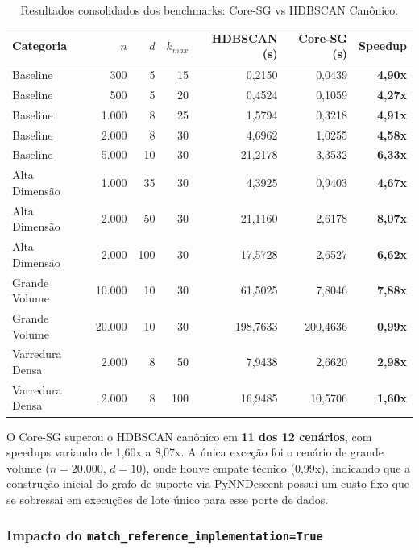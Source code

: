 \documentclass[12pt,a4paper,oneside]{article}
\begin{document}
\begin{table}[H]
  \centering
  \caption{Resultados consolidados dos benchmarks: Core-SG vs HDBSCAN Canônico.}
  \label{tab:benchmark_consolidado}
  \begin{tabular}{lrrrrrr}
    \toprule
    \textbf{Categoria} & \textbf{$n$} & \textbf{$d$} & \textbf{$k_{max}$} &
    \textbf{HDBSCAN (s)} & \textbf{Core-SG (s)} & \textbf{Speedup} \\
    \midrule
    Baseline & 300 & 5 & 15 & 0,2150 & 0,0439 & \textbf{4,90x} \\
    Baseline & 500 & 5 & 20 & 0,4524 & 0,1059 & \textbf{4,27x} \\
    Baseline & 1.000 & 8 & 25 & 1,5794 & 0,3218 & \textbf{4,91x} \\
    Baseline & 2.000 & 8 & 30 & 4,6962 & 1,0255 & \textbf{4,58x} \\
    Baseline & 5.000 & 10 & 30 & 21,2178 & 3,3532 & \textbf{6,33x} \\
    Alta Dimensão & 1.000 & 35 & 30 & 4,3925 & 0,9403 & \textbf{4,67x} \\
    Alta Dimensão & 2.000 & 50 & 30 & 21,1160 & 2,6178 & \textbf{8,07x} \\
    Alta Dimensão & 2.000 & 100 & 30 & 17,5728 & 2,6527 & \textbf{6,62x} \\
    Grande Volume & 10.000 & 10 & 30 & 61,5025 & 7,8046 & \textbf{7,88x} \\
    Grande Volume & 20.000 & 10 & 30 & 198,7633 & 200,4636 & \textbf{0,99x} \\
    Varredura Densa & 2.000 & 8 & 50 & 7,9438 & 2,6620 & \textbf{2,98x} \\
    Varredura Densa & 2.000 & 8 & 100 & 16,9485 & 10,5706 & \textbf{1,60x} \\
    \bottomrule
  \end{tabular}
\end{table}

O Core-SG superou o HDBSCAN canônico em \textbf{11 dos 12 cenários}, com speedups variando de
1,60x a 8,07x. A única exceção foi o cenário de grande volume ($n=20.000$, $d=10$), onde
houve empate técnico (0,99x), indicando que a construção inicial do grafo de suporte via
PyNNDescent possui um custo fixo que se sobressai em execuções de lote único para esse porte
de dados.

\subsubsection{Impacto do \texttt{match\_reference\_implementation=True}}
\end{document}
